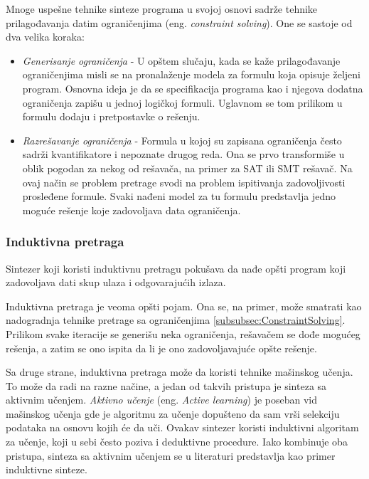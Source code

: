 Mnoge uspešne tehnike sinteze programa u svojoj osnovi sadrže tehnike prilagođavanja datim ograničenjima (eng. \emph{constraint solving}). One se sastoje od dva velika koraka:
\begin{itemize}
    \item \emph{Generisanje ograničenja} - U opštem slučaju, kada se kaže pri\-la\-go\-đa\-va\-nje ograničenjima misli se na pronalaženje modela za formulu koja opisuje željeni program. Osnovna ideja je da se specifikacija programa kao i njegova dodatna ograničenja zapišu u jednoj logičkoj formuli. Uglavnom se tom prilikom u formulu dodaju i pretpostavke o rešenju.
    \item \emph{Razrešavanje ograničenja} - Formula u kojoj su zapisana ograničenja često sadrži kvantifikatore i nepoznate drugog reda. Ona se prvo transformiše u oblik pogodan za nekog od rešavača, na primer za SAT ili SMT rešavač. Na ovaj način se problem pretrage svodi na problem ispitivanja zadovoljivosti prosleđene formule. Svaki nađeni model za tu formulu predstavlja jedno moguće rešenje koje zadovoljava data ograničenja.
\end{itemize}


\subsubsection{Induktivna pretraga}
\label{subsubsec:Induktivna}

Sintezer koji koristi induktivnu pretragu pokušava da nađe opšti program koji zadovoljava dati skup ulaza i odgovarajućih izlaza.

Induktivna pretraga je veoma opšti pojam. Ona se, na primer, može smatrati kao nadogradnja tehnike pretrage sa ograničenjima \ref{subsubsec:ConstraintSolving}. Prilikom svake iteracije se generišu neka ograničenja, rešavačem se dođe mogućeg rešenja, a zatim se ono ispita da li je ono zadovoljavajuće opšte rešenje.

Sa druge strane, induktivna pretraga može da koristi tehnike mašinskog učenja. To može da radi na razne načine, a jedan od takvih pristupa je sinteza sa aktivnim učenjem. \emph{Aktivno učenje} (eng. \emph{Active learning}) je poseban vid mašinskog učenja gde je algoritmu za učenje dopušteno da sam vrši selekciju podataka na osnovu kojih će da uči. Ovakav sintezer koristi induktivni algoritam za učenje, koji u sebi često poziva i deduktivne procedure. Iako kombinuje oba pristupa, sinteza sa aktivnim učenjem se u literaturi predstavlja kao primer induktivne sinteze.

